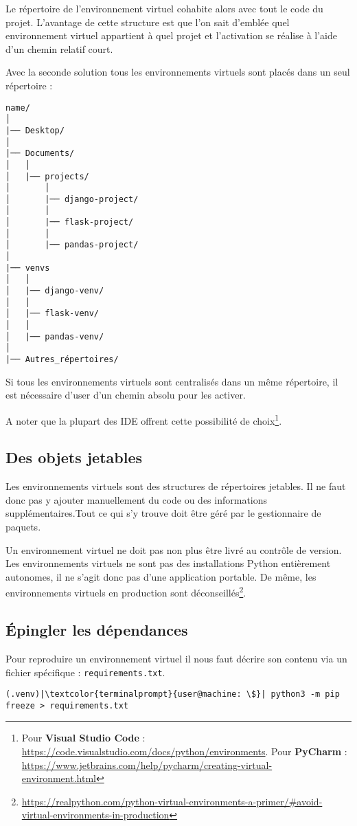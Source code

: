 Le répertoire de l'environnement virtuel cohabite alors avec tout le code du projet. L'avantage de cette structure est que l'on sait d'emblée quel environnement virtuel appartient à quel projet et l'activation se réalise à l'aide d'un chemin relatif court.

Avec la seconde solution tous les environnements virtuels sont placés dans un seul répertoire :
\begin{verbatim}
name/
│
|── Desktop/
│
|── Documents/
│   │
│   |── projects/
│       │
│       |── django-project/
│       │
│       |── flask-project/
│       │
│       |── pandas-project/
│
|── venvs
│   │
│   |── django-venv/
│   │
│   |── flask-venv/
│   │
│   |── pandas-venv/
│
|── Autres_répertoires/
\end{verbatim}

Si tous les environnements virtuels  sont centralisés dans un même répertoire, il est nécessaire d'user d'un chemin absolu pour les activer.

A noter que la plupart des IDE offrent cette possibilité de choix\footnote{Pour \textbf{Visual Studio Code} : \url{https://code.visualstudio.com/docs/python/environments}. Pour \textbf{PyCharm} : \url{https://www.jetbrains.com/help/pycharm/creating-virtual-environment.html}}.

\subsection*{Des objets jetables}
Les environnements virtuels sont des structures de répertoires jetables. Il ne faut donc pas y ajouter manuellement du code ou des informations supplémentaires.Tout ce qui s'y trouve doit être géré par le gestionnaire de paquets.

Un environnement virtuel ne doit pas non plus être livré au contrôle de version. Les environnements virtuels ne sont pas des installations Python entièrement autonomes, il ne s'agit donc pas d'une application portable. De même, les environnements virtuels en production sont déconseillés\footnote{\url{https://realpython.com/python-virtual-environments-a-primer/\#avoid-virtual-environments-in-production}}.

\subsection*{Épingler les dépendances}
Pour reproduire un environnement virtuel  il nous faut décrire son contenu via un fichier spécifique : \texttt{requirements.txt}.
\begin{lstlisting}[style=terminal]
(.venv)|\textcolor{terminalprompt}{user@machine: \$}| python3 -m pip freeze > requirements.txt
\end{lstlisting}

